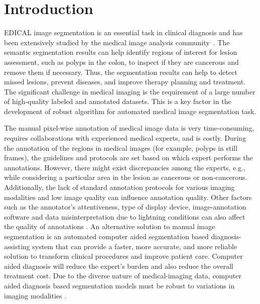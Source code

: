 \documentclass[journal,twoside,web]{IEEEtran}
\begin{document}
\section{Introduction}
\label{sec:introduction}
EDICAL image segmentation is an essential task in clinical diagnosis and has been extensively studied by the medical image analysis community~\cite{celebi2019dermoscopy,caicedo2019nucleus,ali2021deep}. The semantic segmentation results can help identify regions of interest for lesion assessment, such as polyps in the colon, to inspect if they are cancerous and remove them if necessary. Thus, the segmentation results can help to detect missed lesions, prevent diseases, and improve therapy planning and treatment. The significant challenge in medical imaging is the requirement of a large number of high-quality labeled and annotated datasets. This is a key factor in the development of robust algorithm for automated medical image segmentation task.   

The manual pixel-wise annotation of medical image data is very time-consuming, requires collaborations with experienced medical experts, and is costly. During the annotation of the regions in medical images (for example, polyps in still frames), the guidelines and protocols are set based on which expert performs the annotations. However, there might exist discrepancies among the experts, e.g., while considering a particular area in the lesion as cancerous or non-cancerous. Additionally, the lack of standard annotation protocols for various imaging modalities and low image quality can influence annotation quality. Other factors such as the annotator's attentiveness, type of display device, image-annotation software and data misinterpretation due to lightning conditions can also affect the quality of annotations \cite{lux2013annotation}. An alternative solution to manual image segmentation is an automated computer aided segmentation based diagnosis-assisting system that can provide a faster, more accurate, and more reliable solution to transform clinical procedures and improve patient care. Computer aided diagnosis will reduce the expert's burden and also reduce the overall treatment cost. Due to the diverse nature of medical-imaging data, computer aided diagnosis based segmentation models must be robust to variations in imaging modalities \cite{jha2021real}. 
\end{document}
